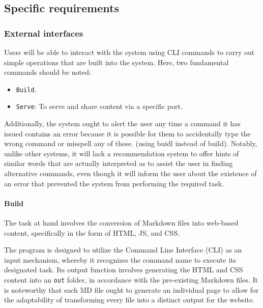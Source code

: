 
\subsection{Specific requirements}\label{subsec:specific-requirements}

\subsubsection{External interfaces}\label{subsubsec:external-interfaces}

Users will be able to interact with the system using CLI commands to
carry out simple operations that are built into the system. Here, two
fundamental commands should be noted:

\begin{itemize}
    \item
    \texttt{Build}.
    \item
    \texttt{Serve}: To serve and share content via a specific port.
\end{itemize}

Additionally, the system ought to alert the user any time a command it
has issued contains an error because it is possible for them to
accidentally type the wrong command or misspell any of these. (using
buidl instead of build). Notably, unlike other systems, it will lack a
recommendation system to offer hints of similar words that are actually
interpreted as to assist the user in finding alternative commands, even
though it will inform the user about the existence of an error that
prevented the system from performing the required task.

\paragraph{Build}\label{par:build}

The task at hand involves the conversion of Markdown files into
web-based content, specifically in the form of HTML, JS, and CSS.

The program is designed to utilize the Command Line Interface (CLI) as
an input mechanism, whereby it recognizes the command name to execute
its designated task. Its output function involves generating the HTML
and CSS content into an \texttt{out} folder, in accordance with the
pre-existing Markdown files. It is noteworthy that each MD file ought to
generate an individual page to allow for the adaptability of
transforming every file into a distinct output for the website.

